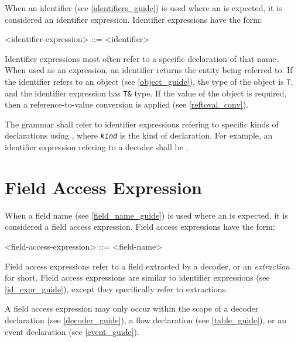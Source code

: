 When an identifier (see \ref{identifiers_guide}) is used where an  is expected, it is considered an identifier expression. Identifier expressions have the form:

\begin{minip}
\begin{grammar}
<identifier-expression> ::= <identifier>
\end{grammar}
\end{minip}

Identifier expressions most often refer to a specific declaration of that name. When used as an expression, an identifier returns the entity being referred to. If the identifier refers to an object (see \ref{object_guide}), the type of the object is \texttt{T}, and the identifier expression has \texttt{T&} type. If the value of the object is required, then a reference-to-value conversion is applied (see \ref{reftoval_conv}).

The grammar shall refer to identifier expressions refering to specific kinds of declarations using , where \texttt{\textit{kind}} is the kind of declaration. For example, an identifier expression refering to a decoder shall be .

\section{Field Access Expression} \label{field_access_expr_guide}

When a field name (see \ref{field_name_guide}) is used where an  is expected, it is considered a field access expression. Field access expressions have the form:

\begin{minip}
\begin{grammar}
<field-access-expression> ::= <field-name>
\end{grammar}
\end{minip}

Field access expressions refer to a field extracted by a decoder, or an \textit{extraction} for short. Field access expressions are similar to identifier expressions (see \ref{id_expr_guide}), except they specifically refer to extractions.

A field access expression may only occur within the scope of a decoder declaration (see \ref{decoder_guide}), a flow declaration (see \ref{table_guide}), or an event declaration (see \ref{event_guide}).

